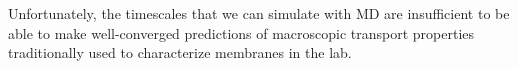 \documentclass{article}
\begin{document}

  Unfortunately, the timescales that we can simulate with MD are insufficient to be
  able to make well-converged predictions of macroscopic transport properties 
  traditionally used to characterize membranes in the lab. \\
\end{document}

